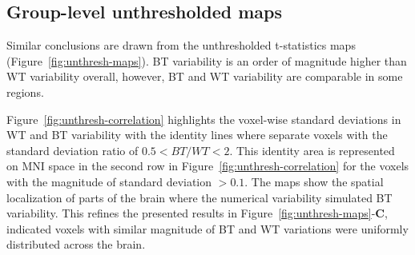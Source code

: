 \documentclass[conference]{IEEEtran}
\begin{document}
\subsection{Group-level unthresholded maps}

Similar conclusions are drawn from the unthresholded t-statistics maps
(Figure~\ref{fig:unthresh-maps}). BT variability is an order of magnitude
higher than WT variability overall, however, BT and WT variability are
comparable in some regions. 

\begin{figure}[ht]
  \end{figure}


Figure~\ref{fig:unthresh-correlation} highlights the voxel-wise standard deviations in WT and BT variability
with the identity lines where separate voxels with the standard deviation ratio of $0.5 < BT/WT < 2$.
This identity area is represented on MNI space in the second row in Figure~\ref{fig:unthresh-correlation}
for the voxels with the magnitude of standard deviation $> 0.1$.
The maps show the spatial localization of parts of the brain where the numerical variability simulated BT variability.
This refines the presented results in Figure~\ref{fig:unthresh-maps}-\textbf{C},
indicated voxels with similar magnitude of BT and WT variations were uniformly distributed across the brain.
\end{document}
